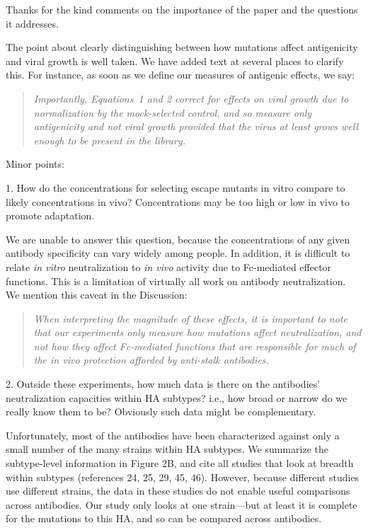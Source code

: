 \documentclass[11pt, oneside]{article}   	%
\begin{document}
{\color{black}
Thanks for the kind comments on the importance of the paper and the questions it addresses.

The point about clearly distinguishing between how mutations affect antigenicity and viral growth is well taken.
We have added text at several places to clarify this.
For instance, as soon as we define our measures of antigenic effects, we say:
\begin{quote}
\textsl{Importantly, Equations~1 and 2 correct for effects on viral growth due to normalization by the mock-selected control, and so measure only antigenicity and not viral growth provided that the virus at least grows well enough to be present in the library.}
\end{quote}}

Minor points:

1. How do the concentrations for selecting escape mutants in vitro compare to likely concentrations in vivo? Concentrations may be too high or low in vivo to promote adaptation.

{\color{black}
We are unable to answer this question, because the concentrations of any given antibody specificity can vary widely among people.
In addition, it is difficult to relate \textit{in vitro} neutralization to \textit{in vivo} activity due to Fc-mediated effector functions.
This is a limitation of virtually all work on antibody neutralization.
We mention this caveat in the Discussion:
\begin{quote}
\textsl{When interpreting the magnitude of these effects, it is important to note that our experiments only measure how mutations affect neutralization, and not how they affect Fc-mediated functions that are responsible for much of the in vivo protection afforded by anti-stalk antibodies.}
\end{quote}
}

2. Outside these experiments, how much data is there on the antibodies' neutralization capacities within HA subtypes? i.e., how broad or narrow do we really know them to be? Obviously such data might be complementary. 

{\color{black}
Unfortunately, most of the antibodies have been characterized against only a small number of the many strains within HA subtypes.
We summarize the subtype-level information in Figure 2B, and cite all studies that look at breadth within subtypes (references 24, 25, 29, 45, 46).
However, because different studies use different strains, the data in these studies do not enable useful comparisons across antibodies.
Our study only looks at one strain---but at least it is complete for the mutations to this HA, and so can be compared across antibodies.}
\end{document}
